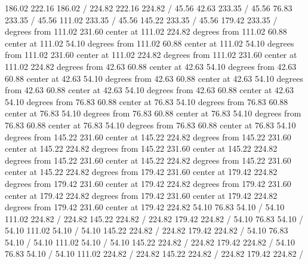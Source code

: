 {\setsolid
{} 186.02 222.16 186.02 /
\setsolid
{} 224.82 222.16 224.82 /
\setsolid
{} 45.56 42.63 233.35 /
\setsolid
{} 45.56 76.83 233.35 /
\setsolid
{} 45.56 111.02 233.35 /
\setsolid
{} 45.56 145.22 233.35 /
\setsolid
{} 45.56 179.42 233.35 /
 degrees from 111.02 231.60 center at 111.02 224.82
 degrees from 111.02 60.88 center at 111.02 54.10
 degrees from 111.02 60.88 center at 111.02 54.10
 degrees from 111.02 231.60 center at 111.02 224.82
 degrees from 111.02 231.60 center at 111.02 224.82
 degrees from 42.63 60.88 center at 42.63 54.10
 degrees from 42.63 60.88 center at 42.63 54.10
 degrees from 42.63 60.88 center at 42.63 54.10
 degrees from 42.63 60.88 center at 42.63 54.10
 degrees from 42.63 60.88 center at 42.63 54.10
 degrees from 76.83 60.88 center at 76.83 54.10
 degrees from 76.83 60.88 center at 76.83 54.10
 degrees from 76.83 60.88 center at 76.83 54.10
 degrees from 76.83 60.88 center at 76.83 54.10
 degrees from 76.83 60.88 center at 76.83 54.10
 degrees from 145.22 231.60 center at 145.22 224.82
 degrees from 145.22 231.60 center at 145.22 224.82
 degrees from 145.22 231.60 center at 145.22 224.82
 degrees from 145.22 231.60 center at 145.22 224.82
 degrees from 145.22 231.60 center at 145.22 224.82
 degrees from 179.42 231.60 center at 179.42 224.82
 degrees from 179.42 231.60 center at 179.42 224.82
 degrees from 179.42 231.60 center at 179.42 224.82
 degrees from 179.42 231.60 center at 179.42 224.82
 degrees from 179.42 231.60 center at 179.42 224.82
\setdashpattern <4pt, 4pt>
 54.10 76.83 54.10 /
 54.10 111.02 224.82 /
 224.82 145.22 224.82 /
 224.82 179.42 224.82 /
\setdashpattern <4pt, 4pt>
 54.10 76.83 54.10 /
 54.10 111.02 54.10 /
 54.10 145.22 224.82 /
 224.82 179.42 224.82 /
\setdashpattern <4pt, 4pt>
 54.10 76.83 54.10 /
 54.10 111.02 54.10 /
 54.10 145.22 224.82 /
 224.82 179.42 224.82 /
\setdashpattern <4pt, 4pt>
 54.10 76.83 54.10 /
 54.10 111.02 224.82 /
 224.82 145.22 224.82 /
 224.82 179.42 224.82 /
}
